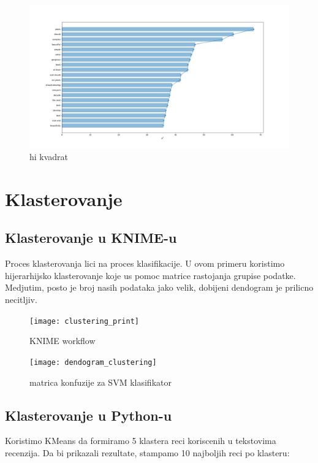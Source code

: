 \documentclass[11pt]{article} %
\begin{document}
\begin{figure}[h!]
	\centering
		\includegraphics[width=1.4\textwidth]{chi_sentiment}
		\caption{hi kvadrat}
	\end{figure}
\newpage
\section{Klasterovanje}
\subsection{Klasterovanje u KNIME-u}
Proces klasterovanja lici na proces klasifikacije. U ovom primeru koristimo hijerarhijsko klasterovanje koje us pomoc 
matrice rastojanja grupise podatke. Medjutim, posto je broj nasih podataka jako velik, dobijeni dendogram je prilicno necitljiv.
\begin{figure}[h!]
	\centering
		\texttt{[image: clustering\_print]}
		\caption{KNIME workflow}
	\end{figure}
\begin{figure}[h!]
	\centering
		\texttt{[image: dendogram\_clustering]}
		\caption{matrica konfuzije za SVM klasifikator}
	\end{figure}

\subsection{Klasterovanje u Python-u}
Koristimo KMeans da formiramo 5 klastera reci koriscenih u tekstovima recenzija. Da bi prikazali rezultate, stampamo 10
najboljih reci po klasteru:
\end{document}
